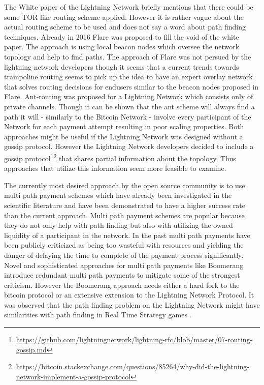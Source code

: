 \documentclass[a4paper]{paper}
\begin{document}
The White paper of the Lightning Network \cite{poon2016bitcoin} briefly mentions that there could be some TOR like routing scheme applied.
However it is rather vague about the actual routing scheme to be used and does not say a word about path finding techniques.
Already in 2016 Flare \cite{prihodko2016flare} was proposed to fill the void of the white paper.
The approach is using local beacon nodes which oversee the network topology and help to find paths.
The approach of Flare was not persued by the lightning network developers though it seems that a current trends towards trampoline routing\cite{Teinturier2019trampoline} seems to pick up the idea to have an expert overlay network that solves routing decisions for endusers similar to the beacon nodes proposed in Flare.
Ant-routing \cite{grunspan2018ant} was proposed for a Lightning Network which consists only of private channels.
Though it can be shown that the ant scheme will always find a path it will - similarly to the Bitcoin Network - involve every participant of the Network for each payment attempt resulting in poor scaling properties.
Both approaches might be useful if the Lightning Network was designed without a gossip protocol.
However the Lightning Network developers decided to include a gossip protocol\footnote{\url{https://github.com/lightningnetwork/lightning-rfc/blob/master/07-routing-gossip.md}}\footnote{\url{https://bitcoin.stackexchange.com/questions/85264/why-did-the-lightning-network-implement-a-gossip-protocol}} that shares partial information about the topology.
Thus approaches that utilize this information seem more feasible to examine.

The currently most desired approach by the open source community is to use multi path payment schemes \cite{osuntokun2018AMP} which have already been investigated \cite{piatkivskyi2018split} in the scientific literature and have been demonstrated to have a higher success rate than the current approach.
Multi path payment schemes are popular because they do not only help with path finding but also with utilizing the owned liquidity of a participant in the network.
In the past multi path payments have been publicly criticized \cite{pickhardt2019pathfinding} as being too wasteful with resources and yielding the danger of delaying the time to complete of the payment process significantly.
Novel and sophisticated approaches for multi path payments like Boomerang \cite{bagaria2019boomerang} introduce redundant multi path payments to mitigate some of the strongest criticism.
However the Boomerang approach needs either a hard fork to the bitcoin protocol or an extensive extension to the Lightning Network Protocol. 
It was observed that the path finding problem on the Lightning Network might have similarities with path finding in Real Time Strategy games \cite{zmnscpxj2019rts}.
\end{document}
